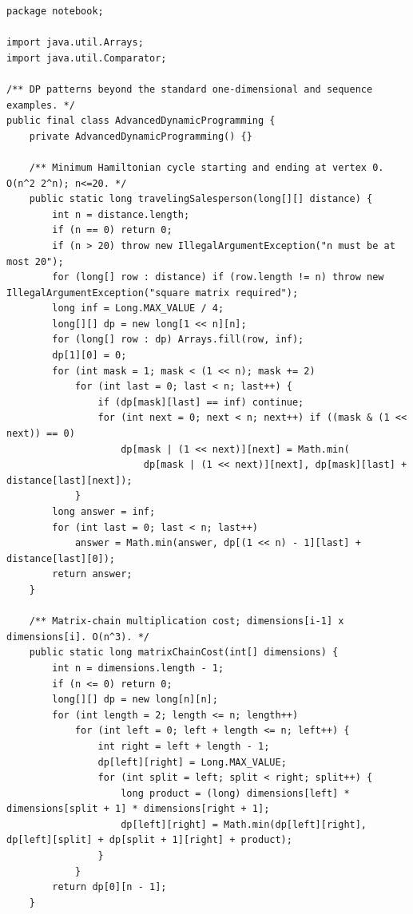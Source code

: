 \documentclass[10pt,letterpaper]{article}
\begin{document}
\begin{lstlisting}
package notebook;

import java.util.Arrays;
import java.util.Comparator;

/** DP patterns beyond the standard one-dimensional and sequence examples. */
public final class AdvancedDynamicProgramming {
    private AdvancedDynamicProgramming() {}

    /** Minimum Hamiltonian cycle starting and ending at vertex 0. O(n^2 2^n); n<=20. */
    public static long travelingSalesperson(long[][] distance) {
        int n = distance.length;
        if (n == 0) return 0;
        if (n > 20) throw new IllegalArgumentException("n must be at most 20");
        for (long[] row : distance) if (row.length != n) throw new IllegalArgumentException("square matrix required");
        long inf = Long.MAX_VALUE / 4;
        long[][] dp = new long[1 << n][n];
        for (long[] row : dp) Arrays.fill(row, inf);
        dp[1][0] = 0;
        for (int mask = 1; mask < (1 << n); mask += 2)
            for (int last = 0; last < n; last++) {
                if (dp[mask][last] == inf) continue;
                for (int next = 0; next < n; next++) if ((mask & (1 << next)) == 0)
                    dp[mask | (1 << next)][next] = Math.min(
                        dp[mask | (1 << next)][next], dp[mask][last] + distance[last][next]);
            }
        long answer = inf;
        for (int last = 0; last < n; last++)
            answer = Math.min(answer, dp[(1 << n) - 1][last] + distance[last][0]);
        return answer;
    }

    /** Matrix-chain multiplication cost; dimensions[i-1] x dimensions[i]. O(n^3). */
    public static long matrixChainCost(int[] dimensions) {
        int n = dimensions.length - 1;
        if (n <= 0) return 0;
        long[][] dp = new long[n][n];
        for (int length = 2; length <= n; length++)
            for (int left = 0; left + length <= n; left++) {
                int right = left + length - 1;
                dp[left][right] = Long.MAX_VALUE;
                for (int split = left; split < right; split++) {
                    long product = (long) dimensions[left] * dimensions[split + 1] * dimensions[right + 1];
                    dp[left][right] = Math.min(dp[left][right], dp[left][split] + dp[split + 1][right] + product);
                }
            }
        return dp[0][n - 1];
    }


\end{lstlisting}
\end{document}
